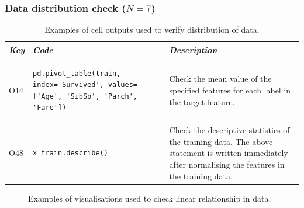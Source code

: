\subsubsection{Data distribution check ($N = 7$)}

\begin{table}
\centering
\caption{Examples of cell outputs used to verify distribution of data.}
\begin{tabular}{@{}m{} m{} m{}@{}}
\toprule
\emph{\textbf{Key}}&
\emph{\textbf{Code}}&
\emph{\textbf{Description}}\\
\midrule

O14&
\begin{lstlisting}
pd.pivot_table(train, index='Survived', values=['Age', 'SibSp', 'Parch', 'Fare'])
\end{lstlisting}&
Check the mean value of the specified features for each label in the target feature.\\

O48&
\begin{lstlisting}
x_train.describe()
\end{lstlisting}&
Check the descriptive statistics of the training data. The above statement is written immediately after normalising the features in the training data.\\

\bottomrule
\end{tabular}
\label{tab:distribution-check}
\end{table}

\begin{figure}
\centering
{}
\caption{Examples of visualisations used to check linear relationship in data.}
\label{fig:distribution-check}
\end{figure}

